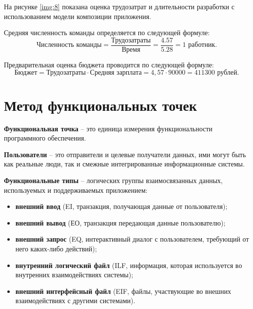 На рисунке \ref{img:8} показана оценка трудозатрат и длительности разработки с использованием модели композиции приложения.


Средняя численность команды определяется по следующей формуле:
\begin{equation}
    \text{Численность команды} = \frac{\text{Трудозатраты}}{\text{Время}} = \frac{4.57}{5.28} = 1 \text{ работник}.
\end{equation}

Предварительная оценка бюджета проводится по следующей формуле:
\begin{equation}
    \text{Бюджет} = \text{Трудозатраты} \cdot \text{Средняя зарплата} = 4{,}57 \cdot 90000 = 411300 \text{ рублей}.
\end{equation}


\clearpage

\section{Метод функциональных точек}

\textbf{Функциональная точка} -- это единица измерения функциональности программного обеспечения.

\textbf{Пользователи} -- это отправители и целевые получатели данных, ими могут быть как реальные люди, так и смежные интегрированные информационные системы.

\textbf{Функциональные типы} -- логических группы взаимосвязанных данных, используемых и поддерживаемых приложением:

\begin{itemize}
    \item \textbf{внешний ввод} (EI, транзакция, получающая данные от пользователя);
    \item \textbf{внешний вывод} (ЕО, транзакция передающая данные пользователю);
    \item \textbf{внешний запрос} (EQ, интерактивный диалог с пользователем, требующий от него каких-либо действий);
    \item \textbf{внутренний логический файл} (ILF, информация, которая используется во внутренних взаимодействиях системы);
    \item \textbf{внешний интерфейсный файл} (EIF, файлы, участвующие во внешних взаимодействиях с другими системами).
\end{itemize}


